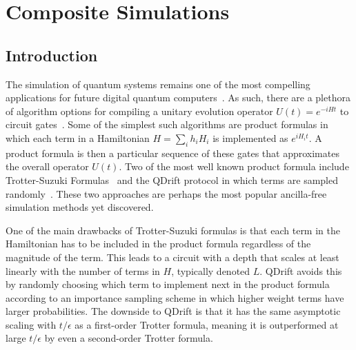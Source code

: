 

\chapter{Composite Simulations} \label{ch:composite_sims}

\section{Introduction}\label{sec:intro}
The simulation of quantum systems remains one of the most compelling applications for future digital quantum computers~\cite{whitfield2011simulation,jordan2012quantum,reiher2017elucidating,babbush2019quantum,su2021fault,o2021efficient}. As such, there are a plethora of algorithm options for compiling a unitary evolution operator $U(t) = e^{-i H t}$ to circuit gates~\cite{aharonov2003adiabatic,berry2007efficient,berry2015simulating,childs2019faster,low2019hamiltonian,low2019well,low2018hamiltonian,qdriftCampbell}. Some of the simplest such algorithms are product formulas in which each term in a Hamiltonian $H = \sum_i h_i H_i$ is implemented as $e^{iH_it}$. A product formula is then a particular sequence
of these gates that approximates the overall operator $U(t)$. Two of the most well known product formula include Trotter-Suzuki Formulas~\cite{berry2007efficient,wiebe2010higher,childs2019faster,childs2021theory} and the QDrift protocol in which terms are sampled randomly~\cite{qdriftCampbell, berry2020time}. These two approaches are perhaps the most popular ancilla-free simulation methods yet discovered.  

One of the main drawbacks of Trotter-Suzuki formulas is that each term in the Hamiltonian has to be included in the product formula regardless of the magnitude of the term.  This leads
to a circuit with a depth that scales at least linearly with the number of terms in $H$, typically denoted $L$. QDrift avoids this by randomly choosing which
term to implement next in the product formula according to an importance sampling scheme in which higher weight terms have larger probabilities. The
downside to QDrift is that it has the same asymptotic scaling with $t/\epsilon$ as a first-order Trotter formula, meaning it is outperformed at large
$t/\epsilon$ by even a second-order Trotter formula. 


